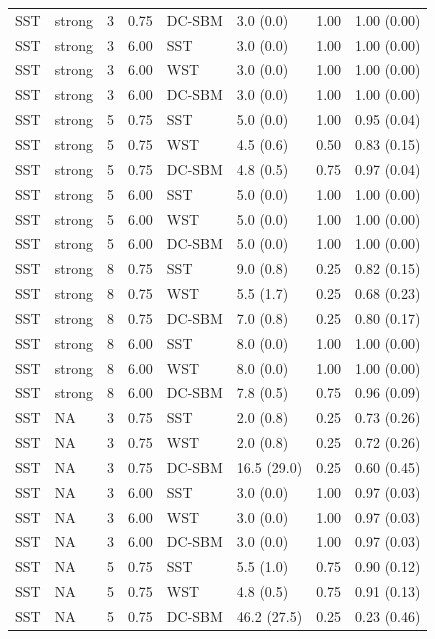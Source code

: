 \begin{table}
\begin{tabular}[t]{llrrllll}
SST & strong & 3 & 0.75 & DC-SBM & 3.0 (0.0) & 1.00 & 1.00 (0.00)\\
SST & strong & 3 & 6.00 & SST & 3.0 (0.0) & 1.00 & 1.00 (0.00)\\
SST & strong & 3 & 6.00 & WST & 3.0 (0.0) & 1.00 & 1.00 (0.00)\\
SST & strong & 3 & 6.00 & DC-SBM & 3.0 (0.0) & 1.00 & 1.00 (0.00)\\
SST & strong & 5 & 0.75 & SST & 5.0 (0.0) & 1.00 & 0.95 (0.04)\\
\addlinespace
SST & strong & 5 & 0.75 & WST & 4.5 (0.6) & 0.50 & 0.83 (0.15)\\
SST & strong & 5 & 0.75 & DC-SBM & 4.8 (0.5) & 0.75 & 0.97 (0.04)\\
SST & strong & 5 & 6.00 & SST & 5.0 (0.0) & 1.00 & 1.00 (0.00)\\
SST & strong & 5 & 6.00 & WST & 5.0 (0.0) & 1.00 & 1.00 (0.00)\\
SST & strong & 5 & 6.00 & DC-SBM & 5.0 (0.0) & 1.00 & 1.00 (0.00)\\
\addlinespace
SST & strong & 8 & 0.75 & SST & 9.0 (0.8) & 0.25 & 0.82 (0.15)\\
SST & strong & 8 & 0.75 & WST & 5.5 (1.7) & 0.25 & 0.68 (0.23)\\
SST & strong & 8 & 0.75 & DC-SBM & 7.0 (0.8) & 0.25 & 0.80 (0.17)\\
SST & strong & 8 & 6.00 & SST & 8.0 (0.0) & 1.00 & 1.00 (0.00)\\
SST & strong & 8 & 6.00 & WST & 8.0 (0.0) & 1.00 & 1.00 (0.00)\\
\addlinespace
SST & strong & 8 & 6.00 & DC-SBM & 7.8 (0.5) & 0.75 & 0.96 (0.09)\\
SST & NA & 3 & 0.75 & SST & 2.0 (0.8) & 0.25 & 0.73 (0.26)\\
SST & NA & 3 & 0.75 & WST & 2.0 (0.8) & 0.25 & 0.72 (0.26)\\
SST & NA & 3 & 0.75 & DC-SBM & 16.5 (29.0) & 0.25 & 0.60 (0.45)\\
SST & NA & 3 & 6.00 & SST & 3.0 (0.0) & 1.00 & 0.97 (0.03)\\
\addlinespace
SST & NA & 3 & 6.00 & WST & 3.0 (0.0) & 1.00 & 0.97 (0.03)\\
SST & NA & 3 & 6.00 & DC-SBM & 3.0 (0.0) & 1.00 & 0.97 (0.03)\\
SST & NA & 5 & 0.75 & SST & 5.5 (1.0) & 0.75 & 0.90 (0.12)\\
SST & NA & 5 & 0.75 & WST & 4.8 (0.5) & 0.75 & 0.91 (0.13)\\
SST & NA & 5 & 0.75 & DC-SBM & 46.2 (27.5) & 0.25 & 0.23 (0.46)\\

\end{tabular}
\end{table}
